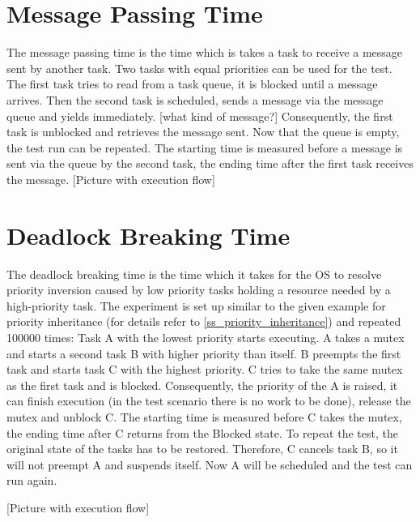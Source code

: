 \section{Message Passing Time}
The message passing time is the time which is takes a task to receive a message sent by another task.
Two tasks with equal priorities can be used for the test.
The first task tries to read from a task queue, it is blocked until a message arrives.
Then the second task is scheduled, sends a message via the message queue and yields immediately. [what kind of message?] 
Consequently, the first task is unblocked and retrieves the message sent.
Now that the queue is empty, the test run can be repeated.
The starting time is measured before a message is sent via the queue by the second task, the ending time after the first task receives the message.
[Picture with execution flow]

\section{Deadlock Breaking Time}
The deadlock breaking time is the time which it takes for the \ac{OS} to resolve priority inversion caused by low priority tasks holding a resource needed by a high-priority task. 
The experiment is set up similar to the given example for priority inheritance (for details refer to \ref{ss_priority_inheritance}) and repeated 100000 times: 
Task A with the lowest priority starts executing.
A takes a mutex and starts a second task B with higher priority than itself.
B preempts the first task and starts task C with the highest priority. 
C tries to take the same mutex as the first task and is blocked.
Consequently, the priority of the A is raised, it can finish execution (in the test scenario there is no work to be done), release the mutex and unblock C.
The starting time is measured before C takes the mutex, the ending time after C returns from the Blocked state.
To repeat the test, the original state of the tasks has to be restored.
Therefore, C cancels task B, so it will not preempt A and suspends itself.
Now A will be scheduled and the test can run again.

[Picture with execution flow]
